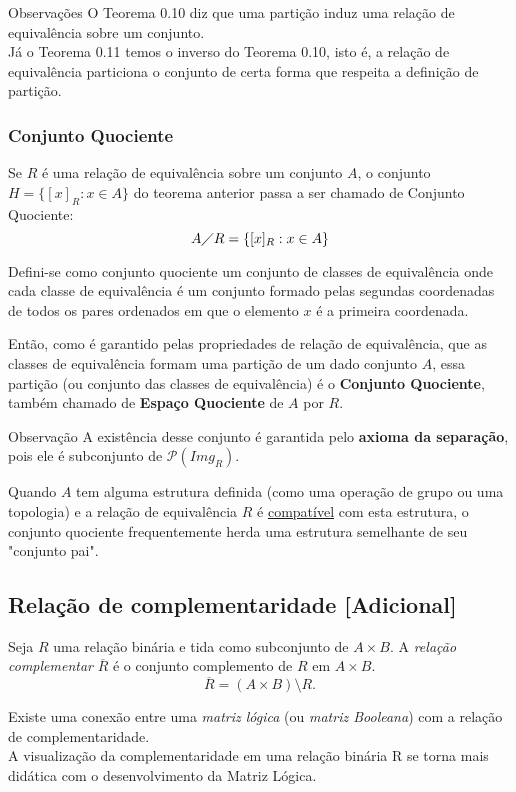          \begin{mymdframed}{Observações}
            O Teorema 0.10 diz que uma partição induz uma relação de equivalência sobre um conjunto.\\
            Já o Teorema 0.11 temos o inverso do Teorema 0.10, isto é, a relação de equivalência particiona o conjunto de certa forma que respeita a definição de partição.
         \end{mymdframed}

      \subsubsection{Conjunto Quociente}
         Se $R$ é uma relação de equivalência sobre um conjunto $A$, o conjunto $H = \{[x]_{R}: x \in A\}$ do teorema anterior passa a ser chamado de Conjunto Quociente:
         $$A \diagup R = \{[x]_{R}: x \in A\}$$
         \begin{definition}
            Defini-se como conjunto quociente um conjunto de classes de equivalência onde cada classe de equivalência é um conjunto formado pelas segundas coordenadas de todos os pares ordenados em que o elemento $x$ é a primeira coordenada.
         \end{definition}
         Então, como é garantido pelas propriedades de relação de equivalência, que as classes de equivalência formam uma partição de um dado conjunto $A$, essa partição (ou conjunto das classes de equivalência) é o \textbf{Conjunto Quociente}, também chamado de \textbf{Espaço Quociente} de $A$ por $R$.
         \begin{mymdframed}{Observação}
            A existência desse conjunto é garantida pelo \textbf{axioma da separação}, pois ele é subconjunto de $\mathcal{P}(\mathit{Img}_{R})$.
         \end{mymdframed}
         Quando $A$ tem alguma estrutura definida (como uma operação de grupo ou uma topologia) e a relação de equivalência $R$ é \underline{compatível} com esta estrutura, o conjunto quociente frequentemente herda uma estrutura semelhante de seu "conjunto pai".

      \subsection{Relação de complementaridade [Adicional]}
         \begin{definition}
            Seja $R$ uma relação binária e tida como subconjunto de $A \times B$. A \textit{relação complementar} $\overline{R}$ é o conjunto complemento de $R$ em $A \times B$.
            $$\overline{R} = (A \times B) \setminus R.$$  
         \end{definition}
         Existe uma conexão entre uma \textit{matriz lógica} (ou \textit{matriz Booleana}) com a relação de complementaridade.\\
         A visualização da complementaridade em uma relação binária R se torna mais didática com o desenvolvimento da Matriz Lógica.

